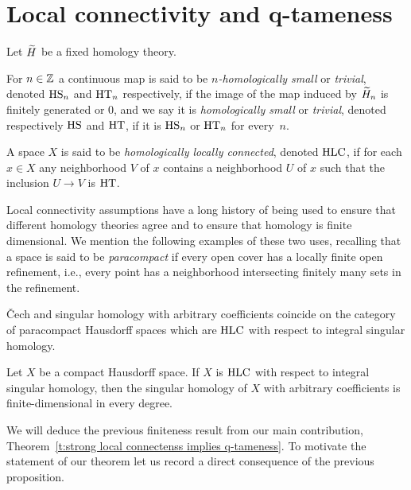 
\section{Local connectivity and q-tameness} \label{s:connectivity}

Let $\widetilde{H}$ be a fixed homology theory.

\begin{defi} \label{defi:local_connectedness}
	For $n \in \mathbb{Z}$ a continuous map is said to be \textit{$n$-homologically small} or \textit{trivial}, denoted $\mathrm{HS}_n$ and $\mathrm{HT}_n$ respectively, if the image of the map induced by $\widetilde{H}_n$ is finitely generated or 0, and we say it is \textit{homologically small} or \textit{trivial}, denoted respectively $\mathrm{HS}$ and $\mathrm{HT}$, if it is $\mathrm{HS}_n$ or $\mathrm{HT}_n$ for every~$n$.
\end{defi}

\begin{defi}
	A space $X$ is said to be \emph{homologically locally connected}, denoted $\mathrm{HLC}$, if for each $x \in X$ any neighborhood $V$ of $x$ contains a neighborhood $U$ of $x$ such that the inclusion $U \to V$ is $\mathrm{HT}$.
\end{defi}

Local connectivity assumptions have a long history of being used to ensure that different homology theories agree and to ensure that homology is finite dimensional.
We mention the following examples of these two uses, recalling that a space is said to be \textit{paracompact} if every open cover has a locally finite open refinement, i.e., every point has a neighborhood intersecting finitely many sets in the refinement.

\begin{prop}[\cite{MR105677}] \label{prop:cech_sing_hom_hlc}
	\v{C}ech and singular homology with arbitrary coefficients coincide on the category of paracompact Hausdorff spaces which are $\mathrm{HLC}$ with respect to integral singular homology.
\end{prop}

\begin{prop} \label{prop:fin_dim_sing_hom}
	Let $X$ be a compact Hausdorff space.
	If $X$ is $\mathrm{HLC}$ with respect to integral singular homology, then the singular homology of $X$ with arbitrary coefficients is finite-dimensional in every degree.
\end{prop}

We will deduce the previous finiteness result from our main contribution, Theorem~\ref{t:strong local connectenss implies q-tameness}.
To motivate the statement of our theorem let us record a direct consequence of the previous proposition.


